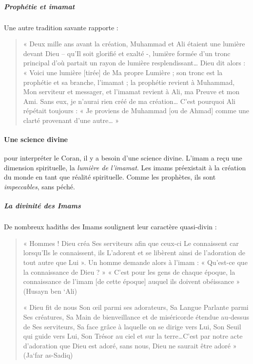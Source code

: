  
  
  
  \subparagraph{Prophétie et imamat}
  
 
Une autre tradition savante rapporte :
\begin{quote}
    

« Deux mille ans avant la création, Muhammad et Ali étaient une lumière
devant Dieu -- qu'Il soit glorifié et exalté -, lumière formée d'un
tronc principal d'où partait un rayon de lumière resplendissant\ldots{}
Dieu dit alors : « Voici une lumière {[}tirée{]} de Ma propre Lumière ;
son tronc est la prophétie et sa branche, l'imamat ; la prophétie
revient à Muhammad, Mon serviteur et messager, et l'imamat revient à
Ali, ma Preuve et mon Ami. Sans eux, je n'aurai rien créé de ma
création\ldots{} C'est pourquoi Ali répétait toujours : « Je proviens de
Muhammad {[}ou de Ahmad{]} comme une clarté provenant d'une
autre\ldots{} »
\end{quote}


 \paragraph{Une science divine} pour interpréter le Coran, il y a besoin d'une science divine. L'imam a reçu une dimension spirituelle, la \textit{lumière de l'imamat}. Les imams préexistait à la création du monde en tant que réalité spirituelle. Comme les prophètes, ils sont \textit{impeccables}, sans péché.
   \subparagraph{La divinité des Imams}
De nombreux hadiths des Imams soulignent leur caractère quasi-divin : 


\begin{quote}


« Hommes ! Dieu créa Ses serviteurs afin que ceux-ci Le connaissent car
lorsqu'Ils le connaissent, ils L'adorent et se libèrent ainsi de
l'adoration de tout autre que Lui ». Un homme demande alors à l'imam : «
Qu'est-ce que la connaissance de Dieu ? » « C'est pour les gens de
chaque époque, la connaissance de l'imam {[}de cette époque{]} auquel
ils doivent obéissance » (Husayn ben `Ali)

« Dieu fit de nous Son œil parmi ses adorateurs, Sa Langue Parlante
parmi Ses créatures, Sa Main de bienveillance et de miséricorde étendue
au-dessus de Ses serviteurs, Sa face grâce à laquelle on se dirige vers
Lui, Son Seuil qui guide vers Lui, Son Trésor au ciel et sur la
terre\ldots C'est par notre acte d'adoration que Dieu est adoré, sans
nous, Dieu ne saurait être adoré » (Ja`far as-Sadiq)


\end{quote}
